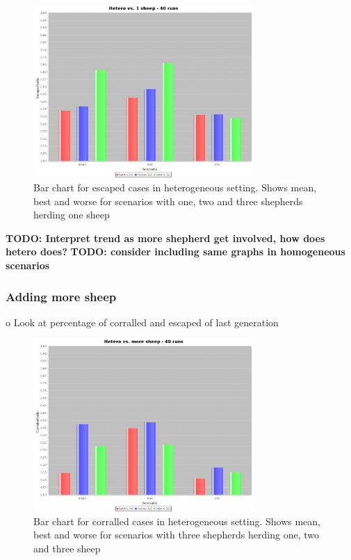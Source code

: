 \documentclass[conference]{IEEEtran}
\begin{document}
\begin{figure}[ht]
	\centering
	\includegraphics[width=3.3in]{imgs/hetero_1v1-hetero_2v1-hetero_3v1-escapedRatio-bar.jpeg}
	\caption{Bar chart for escaped cases in heterogeneous setting. Shows mean, best and worse for scenarios with one, two and three shepherds herding one sheep}
	\label{fig:escaped_oneSheep}
\end{figure}

\textbf{TODO: Interpret trend as more shepherd get involved, how does hetero does?}
\textbf{TODO: consider including same graphs in homogeneous scenarios}

\vspace{0.5em}
\subsubsection{Adding more sheep}
o	Look at percentage of corralled and escaped of last generation


\begin{figure}[ht]
	\centering
	\includegraphics[width=3.3in]{imgs/hetero_3v1-hetero_3v2-hetero_3v3-corralledRatio-bar.jpeg}
	\caption{Bar chart for corralled cases in heterogeneous setting. Shows mean, best and worse for scenarios with three shepherds herding one, two and three sheep}
	\label{fig:corralled_threeShepherd}
\end{figure}
\end{document}
